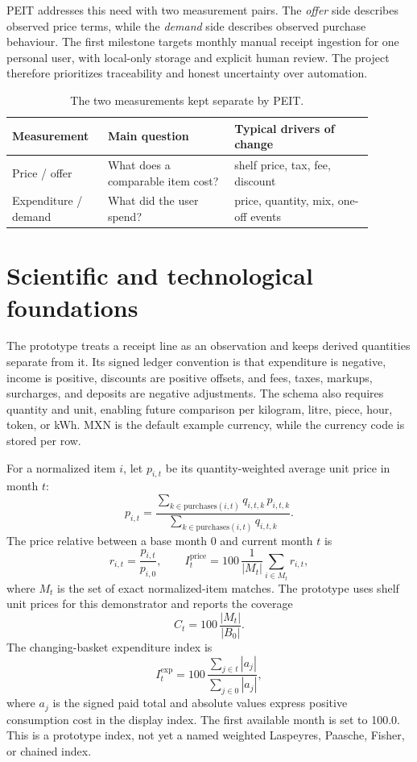 \documentclass[10pt,a4paper]{article}
\newcommand{\chapter}[1]{
  \section{#1}
}
\begin{document}
PEIT addresses this need with two measurement pairs. The \emph{offer} side
describes observed price terms, while the \emph{demand} side describes
observed purchase behaviour. The first milestone targets monthly manual
receipt ingestion for one personal user, with local-only storage and explicit
human review. The project therefore prioritizes traceability and honest
uncertainty over automation.

\begin{table}[ht]
  \centering
  \caption{The two measurements kept separate by PEIT.}
  \small
  \begin{tabular}{p{0.22\linewidth}p{0.32\linewidth}p{0.35\linewidth}}
    \toprule
    Measurement & Main question & Typical drivers of change\\
    \midrule
    Price / offer & What does a comparable item cost? & shelf price,
    tax, fee, discount\\
    Expenditure / demand & What did the user spend? & price,
    quantity, mix, one-off events\\
    \bottomrule
  \end{tabular}
\end{table}

\chapter{Scientific and technological foundations}

The prototype treats a receipt line as an observation and keeps derived
quantities separate from it. Its signed ledger convention is that expenditure
is negative, income is positive, discounts are positive offsets, and fees,
taxes, markups, surcharges, and deposits are negative adjustments. The schema
also requires quantity and unit, enabling future comparison per kilogram,
litre, piece, hour, token, or kWh. MXN is the default example currency, while
the currency code is stored per row.

For a normalized item $i$, let $p_{i,t}$ be its quantity-weighted average unit
price in month $t$:
\[
  p_{i,t}=\frac{\sum_{k\in\mathrm{purchases}(i,t)}q_{i,t,k}\,p_{i,t,k}}
  {\sum_{k\in\mathrm{purchases}(i,t)}q_{i,t,k}}.
\]
The price relative between a base month $0$ and current month $t$ is
\[
  r_{i,t}=\frac{p_{i,t}}{p_{i,0}},
  \qquad
  I^{\mathrm{price}}_t=100\,\frac{1}{|M_t|}\sum_{i\in M_t}r_{i,t},
\]
where $M_t$ is the set of exact normalized-item matches. The prototype uses
shelf unit prices for this demonstrator and reports the coverage
\[
  C_t=100\,\frac{|M_t|}{|B_0|}.
\]
The changing-basket expenditure index is
\[
  I^{\mathrm{exp}}_t=100\,\frac{\sum_{j\in t}|a_j|}
  {\sum_{j\in 0}|a_j|},
\]
where $a_j$ is the signed paid total and absolute values express positive
consumption cost in the display index. The first available month is set to
100.0. This is a prototype index, not yet a named weighted Laspeyres,
Paasche, Fisher, or chained index.
\end{document}
